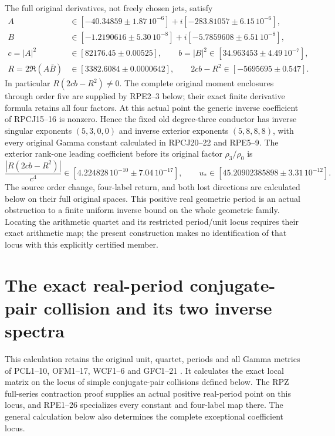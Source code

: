 \documentclass[11pt]{article}
\begin{document}
The full original derivatives, not freely chosen jets, satisfy
\[
 \begin{aligned}
 A&\in[-40.34859\pm1.87\,10^{-6}]
                 +i[-283.81057\pm6.15\,10^{-6}],\\
 B&\in[-1.2190616\pm5.30\,10^{-8}]
                 +i[-5.7859608\pm6.51\,10^{-8}],\\
 c=|A|^2&\in[82176.45\pm0.00525],\qquad
 b=|B|^2\in[34.963453\pm4.49\,10^{-7}],\\
 R=2\Re(A\bar B)&\in[3382.6084\pm0.0000642],\qquad
 2cb-R^2\in[-5695695\pm0.547].
 \end{aligned}\tag{RPZ18}
\]
In particular $R(2cb-R^2)\ne0$. The complete original moment
enclosures through order five are supplied by RPE2--3 below; their
exact finite derivative formula retains all four factors. At this
actual point the generic inverse coefficient of RPCJ15--16 is
nonzero. Hence the fixed old degree-three conductor has inverse
singular exponents $(5,3,0,0)$ and inverse exterior exponents
$(5,8,8,8)$, with every original Gamma constant calculated in
RPCJ20--22 and RPE5--9. The exterior rank-one leading coefficient
before its original factor $\rho_3/\rho_0$ is
\[
 \frac{|R(2cb-R^2)|}{c^4}
       \in[4.224828\,10^{-10}\pm7.04\,10^{-17}],\qquad
 u_*\in[45.20902385898\pm3.31\,10^{-12}].\tag{RPZ19}
\]
The source order change, four-label return, and both lost directions
are calculated below on their full original spaces. This positive
real geometric period is an actual obstruction to a finite uniform
inverse bound on the whole geometric family. Locating the arithmetic
quartet and its restricted period/unit locus requires their exact
arithmetic map; the present construction makes no identification of
that locus with this explicitly certified member.

\section{The exact real-period conjugate-pair collision and its two inverse spectra}
This calculation retains the original unit, quartet, periods and all
Gamma metrics of PCL1--10, OFM1--17, WCF1--6 and GFC1--21
\cite{PCLOriginal,NC,Cumulative,WCF}. It calculates the exact local
matrix on the locus of simple conjugate-pair collisions defined below.
The RPZ full-series contraction proof supplies an actual positive
real-period point on this locus, and RPE1--26 specializes every
constant and four-label map there. The general calculation below
also determines the complete exceptional coefficient locus.
\end{document}
